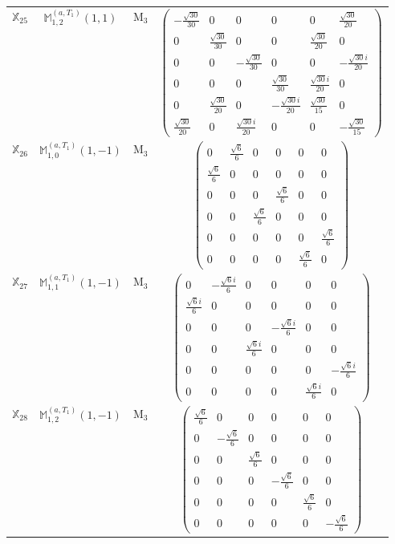 \documentclass[fleqn,10pt,landscape]{article}
\begin{document}
\begin{itemize}
\begin{center}
\begin{longtable}{c|c|c|c}
$ \mathbb{X}_{25} $ & $\mathbb{M}_{1,2}^{(a,T_{1})}(1,1)$ & M$_{3}$ & $\begin{pmatrix} - \frac{\sqrt{30}}{30} & 0 & 0 & 0 & 0 & \frac{\sqrt{30}}{20} \\ 0 & \frac{\sqrt{30}}{30} & 0 & 0 & \frac{\sqrt{30}}{20} & 0 \\ 0 & 0 & - \frac{\sqrt{30}}{30} & 0 & 0 & - \frac{\sqrt{30} i}{20} \\ 0 & 0 & 0 & \frac{\sqrt{30}}{30} & \frac{\sqrt{30} i}{20} & 0 \\ 0 & \frac{\sqrt{30}}{20} & 0 & - \frac{\sqrt{30} i}{20} & \frac{\sqrt{30}}{15} & 0 \\ \frac{\sqrt{30}}{20} & 0 & \frac{\sqrt{30} i}{20} & 0 & 0 & - \frac{\sqrt{30}}{15} \end{pmatrix}$ \\
$ \mathbb{X}_{26} $ & $\mathbb{M}_{1,0}^{(a,T_{1})}(1,-1)$ & M$_{3}$ & $\begin{pmatrix} 0 & \frac{\sqrt{6}}{6} & 0 & 0 & 0 & 0 \\ \frac{\sqrt{6}}{6} & 0 & 0 & 0 & 0 & 0 \\ 0 & 0 & 0 & \frac{\sqrt{6}}{6} & 0 & 0 \\ 0 & 0 & \frac{\sqrt{6}}{6} & 0 & 0 & 0 \\ 0 & 0 & 0 & 0 & 0 & \frac{\sqrt{6}}{6} \\ 0 & 0 & 0 & 0 & \frac{\sqrt{6}}{6} & 0 \end{pmatrix}$ \\
$ \mathbb{X}_{27} $ & $\mathbb{M}_{1,1}^{(a,T_{1})}(1,-1)$ & M$_{3}$ & $\begin{pmatrix} 0 & - \frac{\sqrt{6} i}{6} & 0 & 0 & 0 & 0 \\ \frac{\sqrt{6} i}{6} & 0 & 0 & 0 & 0 & 0 \\ 0 & 0 & 0 & - \frac{\sqrt{6} i}{6} & 0 & 0 \\ 0 & 0 & \frac{\sqrt{6} i}{6} & 0 & 0 & 0 \\ 0 & 0 & 0 & 0 & 0 & - \frac{\sqrt{6} i}{6} \\ 0 & 0 & 0 & 0 & \frac{\sqrt{6} i}{6} & 0 \end{pmatrix}$ \\
$ \mathbb{X}_{28} $ & $\mathbb{M}_{1,2}^{(a,T_{1})}(1,-1)$ & M$_{3}$ & $\begin{pmatrix} \frac{\sqrt{6}}{6} & 0 & 0 & 0 & 0 & 0 \\ 0 & - \frac{\sqrt{6}}{6} & 0 & 0 & 0 & 0 \\ 0 & 0 & \frac{\sqrt{6}}{6} & 0 & 0 & 0 \\ 0 & 0 & 0 & - \frac{\sqrt{6}}{6} & 0 & 0 \\ 0 & 0 & 0 & 0 & \frac{\sqrt{6}}{6} & 0 \\ 0 & 0 & 0 & 0 & 0 & - \frac{\sqrt{6}}{6} \end{pmatrix}$ \\

\end{longtable}
\end{center}
\end{itemize}
\end{document}
